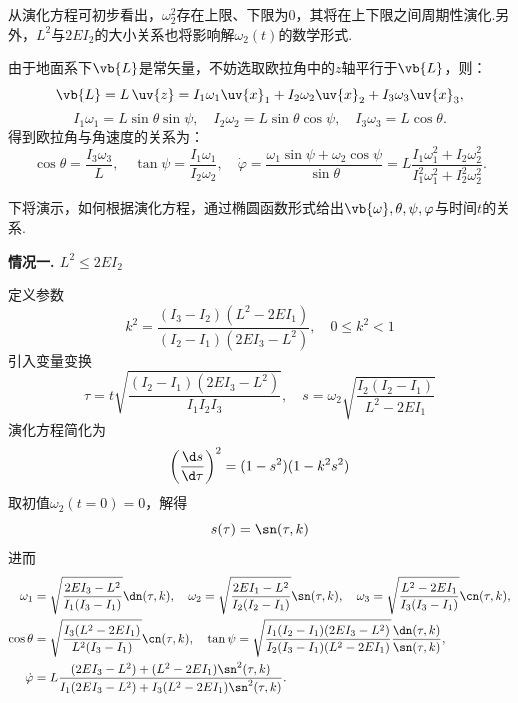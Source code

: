 从演化方程可初步看出，\(\omega_2^2\)存在上限、下限为\(0\)，其将在上下限之间周期性演化.另外，\(L^2\)与\(2EI_2\)的大小关系也将影响解\(\omega_2(t)\)的数学形式.

由于地面系下\(\vb{L}\)是常矢量，不妨选取欧拉角中的\(z\)轴平行于\(\vb{L}\)，则：
\begin{equation*}
	\vb{L}=L\,\uv{z}= I_1 \omega_1 \uv{x}_1 + I_2 \omega_2 \uv{x}_2 + I_3 \omega_3 \uv{x}_3 ,
\end{equation*}
\begin{equation*}
	I_1\omega_1 = L\sin\theta\sin\psi, \quad I_2\omega_2 = L\sin\theta\cos\psi, \quad I_3\omega_3 = L\cos\theta.
\end{equation*}
得到欧拉角与角速度的关系为：
\begin{equation*}
	\cos\theta = \frac{I_3\omega_3}{L}, \quad \tan\psi = \frac{I_1\omega_1}{I_2\omega_2},\quad \dot{\varphi} = \frac{\omega_1\sin\psi + \omega_2\cos\psi}{\sin\theta} = L \frac{I_1\omega_1^2 + I_2\omega_2^2}{I_1^2\omega_1^2 + I_2^2\omega_2^2}.
\end{equation*}

下将演示，如何根据演化方程，通过椭圆函数形式给出\(\vb{\omega},\theta,\psi,\varphi\)与时间\(t\)的关系.

\textbf{情况一.  \(L^2 \leq 2EI_2\)}

定义参数
\begin{equation*}
	k^2 = \frac{(I_3-I_2)(L^2-2EI_1)}{(I_2-I_1)(2EI_3-L^2)}, \quad 0 \leq k^2 < 1
\end{equation*}
引入变量变换
\begin{equation*}
	\tau = t\sqrt{\frac{(I_2-I_1)(2EI_3-L^2)}{I_1I_2I_3}}, \quad
	s = \omega_2\sqrt{\frac{I_2(I_2-I_1)}{L^2-2EI_1}}
\end{equation*}
演化方程简化为
\begin{equation*}
	\left(\frac{\d s}{\d \tau}\right)^2 = (1-s^2)(1-k^2s^2)
\end{equation*}
取初值\(\omega_2(t=0)=0\)，解得
\begin{equation*}
	s(\tau) = \sn(\tau,k)
\end{equation*}
进而
\begin{align*}
	\omega_1      & = \sqrt{\frac{2EI_3-L^2}{I_1(I_3-I_1)}}\dn(\tau,k) ,\quad
	\omega_2=\sqrt{\frac{2EI_1-L^2}{I_2(I_2-I_1)}} \sn(\tau,k),\quad
	\omega_3 = \sqrt{\frac{L^2-2EI_1}{I_3(I_3-I_1)}}\cn(\tau,k),                                               \\
	\cos\theta    & = \sqrt{\frac{I_3(L^2-2EI_1)}{L^2(I_3-I_1)}}\cn(\tau,k),\quad
	\tan\psi = \sqrt{\frac{I_1(I_2-I_1)(2EI_3-L^2)}{I_2(I_3-I_1)(L^2-2EI_1)}}\frac{\dn(\tau,k)}{\sn(\tau,k)},  \\
	\dot{\varphi} & = L \frac{(2EI_3-L^2)+(L^2-2EI_1)\sn^2(\tau,k)}{I_1(2EI_3-L^2)+I_3(L^2-2EI_1)\sn^2(\tau,k)}.
\end{align*}

